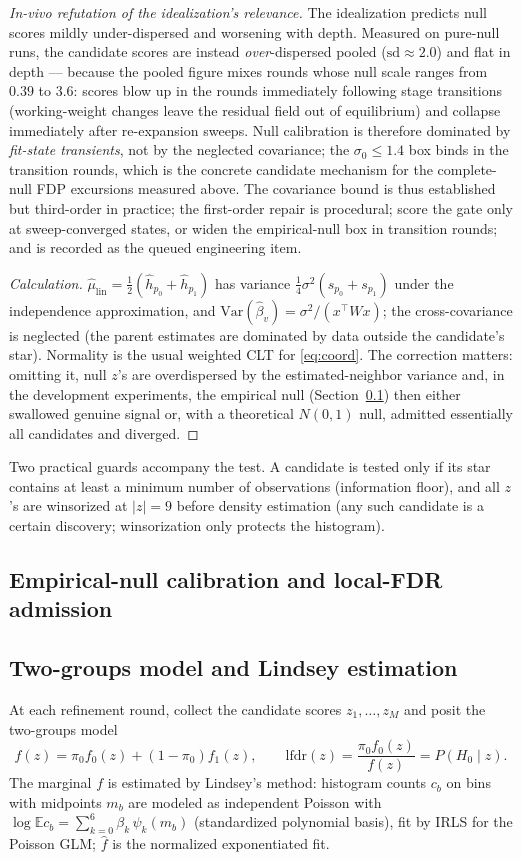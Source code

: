 \documentclass[11pt]{article}
\newcommand{\E}{\mathbb{E}}
\newcommand{\Var}{\mathrm{Var}}
\newcommand{\lfdr}{\mathrm{lfdr}}
\begin{document}
\emph{In-vivo refutation of the idealization's relevance.} The idealization
predicts null scores mildly under-dispersed and worsening with depth.
Measured on pure-null runs, the candidate scores are instead
\emph{over}-dispersed pooled ($\mathrm{sd}\approx2.0$) and flat in depth ---
because the pooled figure mixes rounds whose null scale ranges from
$0.39$ to $3.6$: scores blow up in the rounds immediately following stage
transitions (working-weight changes leave the residual field out of
equilibrium) and collapse immediately after re-expansion sweeps. Null
calibration is therefore dominated by \emph{fit-state transients}, not by
the neglected covariance; the $\sigma_0\le1.4$ box binds in the transition
rounds, which is the concrete candidate mechanism for the complete-null FDP
excursions measured above. The covariance bound is thus established but
third-order in practice; the first-order repair is procedural; score the
gate only at sweep-converged states, or widen the empirical-null box in
transition rounds; and is recorded as the queued engineering item.
\begin{proof}[Calculation]
$\hat\mu_{\mathrm{lin}}=\tfrac12(\hat h_{p_0}+\hat h_{p_1})$ has variance
$\tfrac14\sigma^2(s_{p_0}+s_{p_1})$ under the independence approximation, and
$\Var(\hat\beta_v)=\sigma^2/(x^\top Wx)$; the cross-covariance is neglected (the parent
estimates are dominated by data outside the candidate's star). Normality is the usual
weighted CLT for \eqref{eq:coord}. The correction matters: omitting it, null $z$'s are
overdispersed by the estimated-neighbor variance and, in the development experiments,
the empirical null (Section~\ref{sec:lfdr}) then either swallowed genuine signal or,
with a theoretical $N(0,1)$ null, admitted essentially all candidates and diverged.
\end{proof}

Two practical guards accompany the test. A candidate is tested only if its star
contains at least a minimum number of observations (information floor), and all $z$'s
are winsorized at $|z|=9$ before density estimation (any such candidate is a certain
discovery; winsorization only protects the histogram).

\subsection{Empirical-null calibration and local-FDR admission}\label{sec:lfdr}

\subsection{Two-groups model and Lindsey estimation}
At each refinement round, collect the candidate scores $z_1,\dots,z_M$ and posit the
two-groups model \cite{efron2004,efron2008}
\[
f(z)=\pi_0 f_0(z)+(1-\pi_0)f_1(z),\qquad
\lfdr(z)=\frac{\pi_0 f_0(z)}{f(z)}=P(H_0\mid z).
\]
The marginal $f$ is estimated by Lindsey's method: histogram counts $c_b$ on bins with
midpoints $m_b$ are modeled as independent Poisson with
$\log \E c_b=\sum_{k=0}^{6}\beta_k\,\psi_k(m_b)$ (standardized polynomial basis), fit by
IRLS for the Poisson GLM; $\hat f$ is the normalized exponentiated fit.
\end{document}
